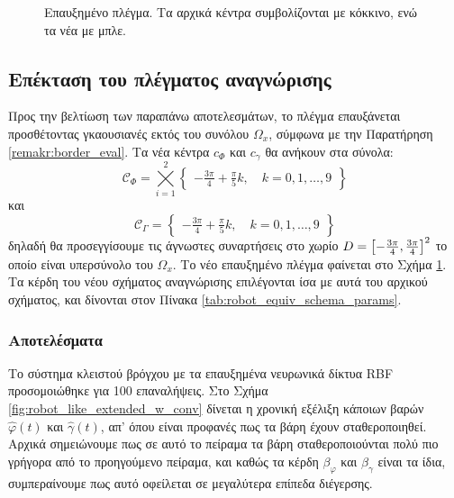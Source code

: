 \pagebreak

{
	\begin{figure}
		
		\captionsetup{format=plain}
		\caption{Επαυξημένο πλέγμα. Τα αρχικά κέντρα συμβολίζονται με κόκκινο, ενώ τα νέα με μπλε.}
		\label{fig:aug_phase_plain}	
	\end{figure}

\subsection{Επέκταση του πλέγματος αναγνώρισης}
\label{subsec:extended_grid}
Προς την βελτίωση των παραπάνω αποτελεσμάτων, το πλέγμα επαυξάνεται προσθέτοντας γκαουσιανές εκτός του συνόλου $\Omega_x$, σύμφωνα με την Παρατήρηση \ref{remakr:border_eval}. Τα νέα κέντρα  $c_\Phi$ και $c_\gamma$ θα ανήκουν στα σύνολα:
\begin{equation*}
\mathcal{C}_\Phi = \bigtimes\limits_{i=1}^{2}  \begin{Bmatrix}
-\frac{3\pi}{4} + \frac{\pi}{5} k, \quad  k = 0,1,\dots,9
\end{Bmatrix}
\end{equation*}
και
\begin{equation*}
\mathcal{C}_\Gamma = \begin{Bmatrix}
-\frac{3\pi}{4} + \frac{\pi}{5} k, \quad  k = 0,1,\dots,9
\end{Bmatrix}
\end{equation*}
δηλαδή θα προσεγγίσουμε τις άγνωστες συναρτήσεις στο χωρίο $D = \bmqty{-\frac{3\pi}{4},\frac{3\pi}{4}}^2$ το οποίο είναι υπερσύνολο του $\Omega_x$. Το νέο επαυξημένο πλέγμα φαίνεται στο Σχήμα \ref{fig:aug_phase_plain}. Τα κέρδη του νέου σχήματος αναγνώρισης επιλέγονται ίσα με αυτά του αρχικού σχήματος, και δίνονται στον Πίνακα \ref{tab:robot_equiv_schema_params}.

}

\subsubsection{Αποτελέσματα}
Το σύστημα κλειστού βρόγχου με τα επαυξημένα νευρωνικά δίκτυα RBF προσομοιώθηκε για 100 επαναλήψεις. Στο Σχήμα \ref{fig:robot_like_extended_w_conv} δίνεται η χρονική εξέλιξη κάποιων βαρών $\hat{\varphi}(t)$ και $\hat{\gamma}(t)$, απ' όπου είναι προφανές πως τα βάρη έχουν σταθεροποιηθεί. Αρχικά σημειώνουμε πως σε αυτό το πείραμα τα βάρη σταθεροποιούνται πολύ πιο γρήγορα από το προηγούμενο πείραμα, και καθώς τα κέρδη $\beta_\varphi$ και $\beta_\gamma$ είναι τα ίδια, συμπεραίνουμε πως αυτό οφείλεται σε μεγαλύτερα επίπεδα διέγερσης.

